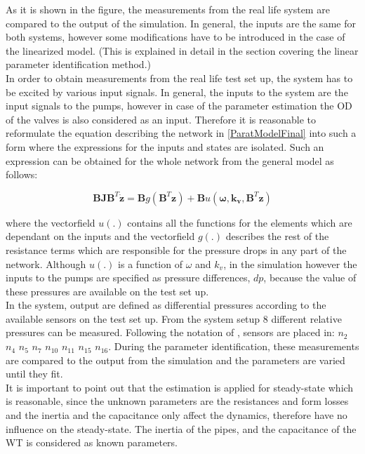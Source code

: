 As it is shown in the figure, the measurements from the real life system are compared to the output of the simulation. In general, the inputs are the same for both systems, however some modifications have to be introduced in the case of the linearized model. (This is explained in detail in the section covering the linear parameter identification method.)
\\
In order to obtain measurements from the real life test set up, the system has to be excited by various input signals. In general, the inputs to the system are the input signals to the pumps, however in case of the parameter estimation the OD of the valves is also considered as an input. Therefore it is reasonable to reformulate the equation describing the network in \eqref{ParatModelFinal} into such a form where the expressions for the inputs and states are isolated. Such an expression can be obtained for the whole network from the general model as follows: 

\begin{equation}
 \pmb{B}\pmb{J {B}}^T \pmb{\dot{z}} = \pmb{B} g(\pmb{B}^T \pmb{z})+ \pmb{B} u(\pmb{\omega},\pmb{k_v	}, \pmb{B}^T \pmb{z})
 \label{InputOutputmodel}
\end{equation}

where the vectorfield $u(.)$ contains all the functions for the elements which are dependant on the inputs and the vectorfield $g(.)$ describes the rest of the resistance terms which are responsible for the pressure drops in any part of the network. Although $u(.)$ is a function of $\omega$ and $k_v$, in the simulation however the inputs to the pumps are specified as pressure differences, $dp$, because the value of these pressures are available on the test set up. 
\\
In the system, output are defined as differential pressures according to the available sensors on the test set up. From the system setup $8$ different relative pressures can be measured. Following the notation of , sensors are placed in: 
$n_2$ $n_4$ $n_5$ $n_7$ $n_{10}$ $n_{11}$ $n_{15}$ $n_{16}$. During the parameter identification, these measurements are compared to the output from the simulation and the parameters are varied until they fit.
\\
It is important to point out that the estimation is applied for steady-state which is reasonable, since the unknown parameters are the resistances and form losses and the inertia and the capacitance only affect the dynamics, therefore have no influence on the steady-state. The inertia of the pipes, and the capacitance of the WT is considered as known parameters. 

